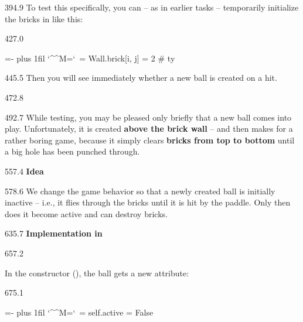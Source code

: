 \documentclass{aslab}
\makeatletter
\newcommand*\fn[1]{\textcolor{codecyan}{#1}}
\newcommand*\num[1]{\textcolor{codered}{#1}}
\newcommand*\cmt[1]{\textcolor{codepurple}{#1}}
\newenvironment{pycode}{\par\ttfamily\hyphenchar\font=-1
  \lineskiplimit=-\maxdimen\lineskip=0pt\parindent=0pt
  \parfillskip=0pt plus 1fil\relax
  \catcode`\^^M=\active\catcode`\ =\active\py@setup\py@gobble}{}
\newcommand*\emo[1]{\makebox[18bp][l]{\emoji{#1}}}
\makeatother
\begin{document}
\begin{region}[pitch=13.2]{394.9}
To test this specifically, you can -- as in earlier tasks -- temporarily
initialize the bricks in  like this:
\end{region}

\begin{region}[]{427.0}
\begin{pycode}
Wall.brick[i, j] = \num{2} \cmt{\# ty}
\end{pycode}
\end{region}

\begin{region}{445.5}
Then you will see immediately whether a new ball is created on a hit.
\end{region}

\begin{region}{472.8}
\end{region}

\begin{region}[pitch=13.9]{492.7}
While testing, you may be pleased only briefly that a new ball comes into
play. Unfortunately, it is created \textbf{above the brick wall} -- and then
makes for a rather boring game, because it simply clears \textbf{bricks from
top to bottom} until a big hole has been punched through.
\end{region}

\begin{region}{557.4}
\emo{1F9E0}\textbf{Idea}
\end{region}

\begin{region}[pitch=13.2]{578.6}
We change the game behavior so that a newly created ball is initially
inactive -- i.e., it flies through the bricks until it is hit by the paddle.
Only then does it become active and can destroy bricks.
\end{region}

\begin{region}{635.7}
\emo{1F527}\textbf{Implementation in} 
\end{region}

\begin{region}{657.2}
\begin{tasks}
\item In the constructor (), the ball gets a new attribute:
\end{tasks}
\end{region}

\begin{region}[x=74.7]{675.1}
\begin{pycode}
self.active = \fn{False}
\end{pycode}
\end{region}
\end{document}
